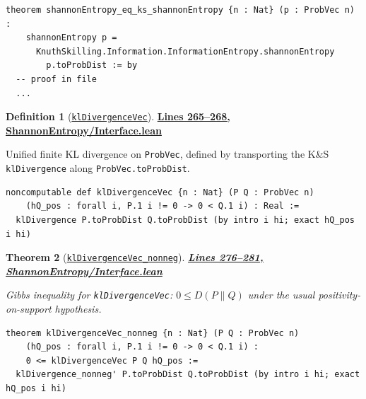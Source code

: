 \documentclass[11pt]{article}
\newtheorem{theorem}{Theorem}[section]
\theoremstyle{definition}
\newtheorem{definition}[theorem]{Definition}
\theoremstyle{remark}
\begin{document}
\begin{lstlisting}[caption={Shannon entropy: ProbVec version equals KS ProbDist version}]
theorem shannonEntropy_eq_ks_shannonEntropy {n : Nat} (p : ProbVec n) :
    shannonEntropy p =
      KnuthSkilling.Information.InformationEntropy.shannonEntropy
        p.toProbDist := by
  -- proof in file
  ...
\end{lstlisting}

\begin{definition}[\href{https://github.com/zariuq/MeTTapedia/blob/main/lean/mettapedia/Mettapedia/InformationTheory/ShannonEntropy/Interface.lean\#L266}{\texttt{klDivergenceVec}}]
\textbf{\href{https://github.com/zariuq/MeTTapedia/blob/main/lean/mettapedia/Mettapedia/InformationTheory/ShannonEntropy/Interface.lean\#L265-L268}{Lines 265--268, ShannonEntropy/Interface.lean}}

Unified finite KL divergence on \texttt{ProbVec}, defined by transporting the K\&S \texttt{klDivergence}
along \texttt{ProbVec.toProbDist}.
\end{definition}

\begin{lstlisting}[caption={KL divergence on ProbVec (via KS klDivergence)}]
noncomputable def klDivergenceVec {n : Nat} (P Q : ProbVec n)
    (hQ_pos : forall i, P.1 i != 0 -> 0 < Q.1 i) : Real :=
  klDivergence P.toProbDist Q.toProbDist (by intro i hi; exact hQ_pos i hi)
\end{lstlisting}

\begin{theorem}[\href{https://github.com/zariuq/MeTTapedia/blob/main/lean/mettapedia/Mettapedia/InformationTheory/ShannonEntropy/Interface.lean\#L278}{\texttt{klDivergenceVec\_nonneg}}]
\textbf{\href{https://github.com/zariuq/MeTTapedia/blob/main/lean/mettapedia/Mettapedia/InformationTheory/ShannonEntropy/Interface.lean\#L276-L281}{Lines 276--281, ShannonEntropy/Interface.lean}}

Gibbs inequality for \texttt{klDivergenceVec}: $0 \le D(P\|Q)$ under the usual positivity-on-support
hypothesis.
\end{theorem}

\begin{lstlisting}[caption={Gibbs inequality on ProbVec}]
theorem klDivergenceVec_nonneg {n : Nat} (P Q : ProbVec n)
    (hQ_pos : forall i, P.1 i != 0 -> 0 < Q.1 i) :
    0 <= klDivergenceVec P Q hQ_pos :=
  klDivergence_nonneg' P.toProbDist Q.toProbDist (by intro i hi; exact hQ_pos i hi)
\end{lstlisting}
\end{document}
